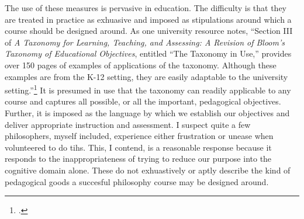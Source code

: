 \documentclass[letterpaper,notitlepage,12pt]{article}
\begin{document}
The use of these measures is pervasive in education.
The difficulty is that they are treated in practice as exhuasive and imposed as
stipulations around which a course should be designed around.  As one university
resource notes, ``Section III of \textit{A Taxonomy for Learning, Teaching, and
Assessing: A Revision of Bloom’s Taxonomy of Educational Objectives}, entitled
“The Taxonomy in Use,” provides over 150 pages of examples of applications of
the taxonomy. Although these examples are from the K-12 setting, they are easily
adaptable to the university setting.''\footcite{armstrong_blooms_nodate}
It is presumed in use that the taxonomy can readily applicable to any course and
captures all possible, or all the important, pedagogical objectives.
Further, it is imposed as the language by which we establish our objectives and
deliver appropriate instruction and assessment.
I suspect quite a few philosophers, myself included, experience either
frustration or unease when volunteered to do tihs.
This, I contend, is a reasonable response because it responds to the
inappropriateness of trying to reduce our purpose into the cognitive domain
alone.
These do not exhuastively or aptly describe the kind of pedagogical goods a
succesful philosophy course may be designed around.











































\nocite{plato_theaetetus_nodate}

\printbibliography
\end{document}
